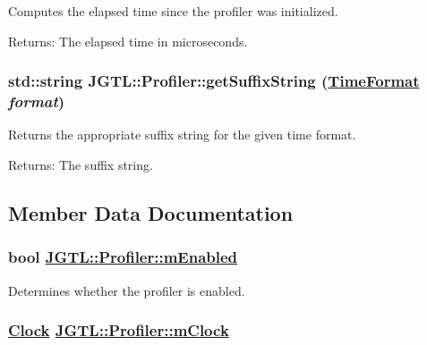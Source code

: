 Computes the elapsed time since the profiler was initialized.

\begin{Desc}
\item[Returns:]The elapsed time in microseconds. \end{Desc}
\hypertarget{class_j_g_t_l_1_1_profiler_5aeaccffe46b7a899b57e0e54f9ce797}{
\subsubsection[getSuffixString]{\setlength{\rightskip}{0pt plus 5cm}std::string JGTL::Profiler::get\-Suffix\-String (\hyperlink{namespace_j_g_t_l_11a34d88ecadd1c99354adc21fd5abe6}{Time\-Format} {\em format})}}
\label{class_j_g_t_l_1_1_profiler_5aeaccffe46b7a899b57e0e54f9ce797}


Returns the appropriate suffix string for the given time format.

\begin{Desc}
\item[Returns:]The suffix string. \end{Desc}


\subsection{Member Data Documentation}
\hypertarget{class_j_g_t_l_1_1_profiler_3eb8fff02ac8b0a76273ee80486ec7cc}{
\subsubsection[mEnabled]{\setlength{\rightskip}{0pt plus 5cm}bool \hyperlink{class_j_g_t_l_1_1_profiler_3eb8fff02ac8b0a76273ee80486ec7cc}{JGTL::Profiler::m\-Enabled}}}
\label{class_j_g_t_l_1_1_profiler_3eb8fff02ac8b0a76273ee80486ec7cc}


Determines whether the profiler is enabled. 

\hypertarget{class_j_g_t_l_1_1_profiler_a3e9ba84db33b2174fe49fc1d7b4939e}{
\subsubsection[mClock]{\setlength{\rightskip}{0pt plus 5cm}\hyperlink{class_j_g_t_l_1_1_clock}{Clock} \hyperlink{class_j_g_t_l_1_1_profiler_a3e9ba84db33b2174fe49fc1d7b4939e}{JGTL::Profiler::m\-Clock}}}
\label{class_j_g_t_l_1_1_profiler_a3e9ba84db33b2174fe49fc1d7b4939e}


